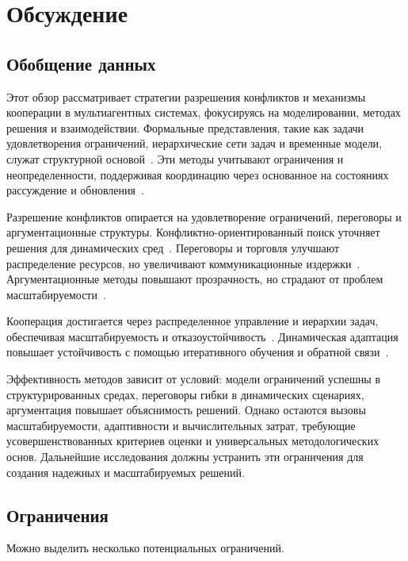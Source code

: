 \documentclass[%
]{ittmm}
\begin{document}
\section{Обсуждение}

\subsection{Обобщение данных}

Этот обзор рассматривает стратегии разрешения конфликтов и механизмы кооперации в мультиагентных системах,
фокусируясь на моделировании, методах решения и взаимодействии.
Формальные представления, такие как задачи удовлетворения ограничений,
иерархические сети задач и временные модели, служат структурной основой~\cite{GROSZ1996269,KOMENDA201476}.
Эти методы учитывают ограничения и неопределенности, поддерживая координацию через основанное на состояниях рассуждение и обновления~\cite{STOLBA2017175,LU2014215}.

Разрешение конфликтов опирается на удовлетворение ограничений, переговоры и аргументационные структуры.
Конфликтно-ориентированный поиск уточняет решения для динамических сред~\cite{SHARON201540}.
Переговоры и торговля улучшают распределение ресурсов,
но увеличивают коммуникационные издержки~\cite{PAJARESFERRANDO201322,FRANKOVIC20017}.
Аргументационные методы повышают прозрачность, но страдают от проблем масштабируемости~\cite{FERRANDO20171}.

Кооперация достигается через распределенное управление и иерархии задач,
обеспечивая масштабируемость и отказоустойчивость~\cite{MA2021103823,JUNG1999149}.
Динамическая адаптация повышает устойчивость с помощью итеративного обучения и обратной связи~\cite{SEMIZ2021220}.

Эффективность методов зависит от условий: модели ограничений успешны в структурированных средах,
переговоры гибки в динамических сценариях, аргументация повышает объяснимость решений.
Однако остаются вызовы масштабируемости, адаптивности и вычислительных затрат,
требующие усовершенствованных критериев оценки и универсальных методологических основ.
Дальнейшие исследования должны устранить эти ограничения для создания надежных и масштабируемых решений.

\subsection{Ограничения}

Можно выделить несколько потенциальных ограничений.  
\end{document}

